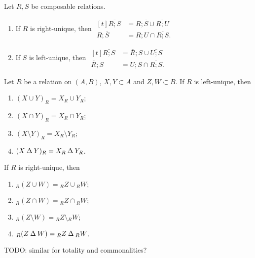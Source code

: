 \begin{lemma}
Let $R,S$ be composable relations.
\begin{enumerate}
\item If $R$ is right-unique, then $\begin{aligned}[t]
\overline{R;S} &= R;\overline{S} \cup \overline{R;U} \\
R;\overline{S} &= R;U\cap \overline{R;S}.
\end{aligned}$
\item If $S$ is left-unique, then $\begin{aligned}[t]
\overline{R;S} &= \overline{R};S \cup \overline{U;S} \\
\overline{R};S &= U;S\cap \overline{R;S}.
\end{aligned}$
\end{enumerate}
\end{lemma}

\begin{lemma} \label{imagePreimageUniqueness}
Let $R$ be a relation on $(A, B)$, $X,Y\subset A$ and $Z,W\subset B$. If $R$ is left-unique, then
\begin{enumerate}
\item $(X\cup Y)_R = X_R\cup Y_R$;
\item $(X\cap Y)_R = X_R\cap Y_R$;
\item $(X\setminus Y)_R = X_R\setminus Y_R$;
\item $(X\mathbin{\Delta} Y)_R = X_R\mathbin{\Delta} Y_R$.
\end{enumerate}
If $R$ is right-unique, then
\begin{enumerate}
\item $_R(Z\cup W) = {_RZ}\cup {_RW}$;
\item $_R(Z\cap W) = {_RZ}\cap {_RW}$;
\item $_R(Z\setminus W) = {_RZ}\setminus {_RW}$;
\item $_R(Z\mathbin{\Delta} W) = {_RZ}\mathbin{\Delta} {_RW}$.
\end{enumerate}
\end{lemma}
TODO: similar for totality and commonalities?

